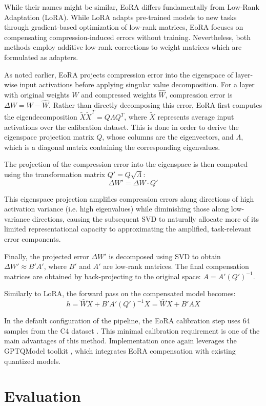 While their names might be similar, EoRA differs fundamentally from Low-Rank Adaptation (LoRA). While LoRA adapts pre-trained models to new tasks through gradient-based optimization of low-rank matrices, EoRA focuses on compensating compression-induced errors without training. Nevertheless, both methods employ additive low-rank corrections to weight matrices which are formulated as adapters.

As noted earlier, EoRA projects compression error into the eigenspace of layer-wise input activations before applying singular value decomposition. For a layer with original weights $W$ and compressed weights $\hat{W}$, compression error is $\Delta W = W - \hat{W}$. Rather than directly decomposing this error, EoRA first computes the eigendecomposition $\tilde{X}\tilde{X}^T = Q\Lambda Q^T$, where $\tilde{X}$ represents average input activations over the calibration dataset. This is done in order to derive the eigenspace projection matrix $Q$, whose columns are the eigenvectors, and $\Lambda$, which is a diagonal matrix containing the corresponding eigenvalues.

The projection of the compression error into the eigenspace is then computed using the transformation matrix $Q' = Q\sqrt{\Lambda}$:
\begin{equation}
\Delta W' = \Delta W \cdot Q'
\end{equation}

This eigenspace projection amplifies compression errors along directions of high activation variance (i.e. high eigenvalues) while diminishing those along low-variance directions, causing the subsequent SVD to naturally allocate more of its limited representational capacity to approximating the amplified, task-relevant error components.

Finally, the projected error $\Delta W'$ is decomposed using SVD to obtain $\Delta W' \approx B'A'$, where $B'$ and $A'$ are low-rank matrices. The final compensation matrices are obtained by back-projecting to the original space: $A = A'(Q')^{-1}$.

Similarly to LoRA, the forward pass on the compensated model becomes:
\begin{equation}
h = \hat{W}X + B'A'(Q')^{-1}X = \hat{W}X + B'AX
\end{equation}

In the default configuration of the pipeline, the EoRA calibration step uses 64 samples from the C4 dataset \cite{c4}. This minimal calibration requirement is one of the main advantages of this method. Implementation once again leverages the GPTQModel toolkit \cite{gptqmodel}, which integrates EoRA compensation with existing quantized models.


\section{Evaluation} \label{evaluation}
